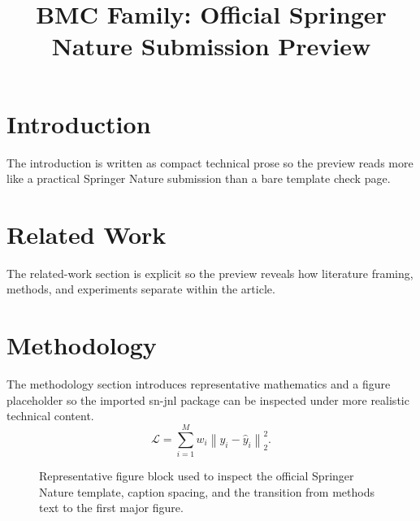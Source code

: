 \documentclass[pdflatex,sn-vancouver-num]{sn-jnl}
\begin{document}
\title[Article Title]{BMC Family: Official Springer Nature Submission Preview}
\author*[1]{ }
\author[2]{ }
\maketitle
\section{Introduction}
The introduction is written as compact technical prose so the preview reads more like a practical Springer Nature submission than a bare template check page.
\section{Related Work}
The related-work section is explicit so the preview reveals how literature framing, methods, and experiments separate within the article.
\section{Methodology}
The methodology section introduces representative mathematics and a figure placeholder so the imported sn-jnl package can be inspected under more realistic technical content.
\begin{equation}
\mathcal{L} = \sum_{i=1}^{M} w_i \left\| y_i - \hat{y}_i \right\|_2^2.
\end{equation}
\begin{figure}[t]
\centering
{}
\caption{Representative figure block used to inspect the official Springer Nature template, caption spacing, and the transition from methods text to the first major figure.}
\end{figure}
\end{document}
